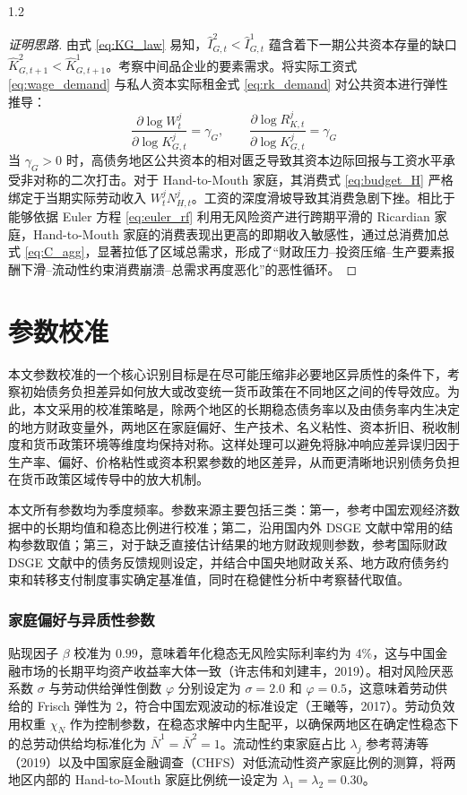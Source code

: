 \documentclass[12pt,UTF8]{ctexart}
\begin{document}
\begin{spacing}{1.2}
		\begin{proof}[证明思路]
			由式 \eqref{eq:KG_law} 易知，$\hat{I}_{G,t}^2 < \hat{I}_{G,t}^1$ 蕴含着下一期公共资本存量的缺口 $\hat{K}_{G,t+1}^2 < \hat{K}_{G,t+1}^1$。考察中间品企业的要素需求。将实际工资式 \eqref{eq:wage_demand} 与私人资本实际租金式 \eqref{eq:rk_demand} 对公共资本进行弹性推导：
			\begin{equation}
				\frac{\partial \log W_t^j}{\partial \log K_{G,t}^j} = \gamma_G, \qquad \frac{\partial \log R_{K,t}^j}{\partial \log K_{G,t}^j} = \gamma_G
			\end{equation}
			当 $\gamma_G > 0$ 时，高债务地区公共资本的相对匮乏导致其资本边际回报与工资水平承受非对称的二次打击。对于 Hand-to-Mouth 家庭，其消费式 \eqref{eq:budget_H} 严格绑定于当期实际劳动收入 $W_t^j N_{H,t}^j$。工资的深度滑坡导致其消费急剧下挫。相比于能够依据 Euler 方程 \eqref{eq:euler_rf} 利用无风险资产进行跨期平滑的 Ricardian 家庭，Hand-to-Mouth 家庭的消费表现出更高的即期收入敏感性，通过总消费加总式 \eqref{eq:C_agg}，显著拉低了区域总需求，形成了“财政压力--投资压缩--生产要素报酬下滑--流动性约束消费崩溃--总需求再度恶化”的恶性循环。
		\end{proof}
		
		\section{参数校准}
		
		本文参数校准的一个核心识别目标是在尽可能压缩非必要地区异质性的条件下，考察初始债务负担差异如何放大或改变统一货币政策在不同地区之间的传导效应。为此，本文采用的校准策略是，除两个地区的长期稳态债务率以及由债务率内生决定的地方财政变量外，两地区在家庭偏好、生产技术、名义粘性、资本折旧、税收制度和货币政策环境等维度均保持对称。这样处理可以避免将脉冲响应差异误归因于生产率、偏好、价格粘性或资本积累参数的地区差异，从而更清晰地识别债务负担在货币政策区域传导中的放大机制。
		
		本文所有参数均为季度频率。参数来源主要包括三类：第一，参考中国宏观经济数据中的长期均值和稳态比例进行校准；第二，沿用国内外 DSGE 文献中常用的结构参数取值；第三，对于缺乏直接估计结果的地方财政规则参数，参考国际财政 DSGE 文献中的债务反馈规则设定，并结合中国央地财政关系、地方政府债务约束和转移支付制度事实确定基准值，同时在稳健性分析中考察替代取值。
		
		\subsubsection{家庭偏好与异质性参数}
		贴现因子 $\beta$ 校准为 $0.99$，意味着年化稳态无风险实际利率约为 4\%，这与中国金融市场的长期平均资产收益率大体一致（许志伟和刘建丰，2019）。相对风险厌恶系数 $\sigma$ 与劳动供给弹性倒数 $\varphi$ 分别设定为 $\sigma = 2.0$ 和 $\varphi = 0.5$，这意味着劳动供给的 Frisch 弹性为 2，符合中国宏观波动的标准设定（王曦等，2017）。劳动负效用权重 $\chi_N$ 作为控制参数，在稳态求解中内生配平，以确保两地区在确定性稳态下的总劳动供给均标准化为 $\bar{N}^1 = \bar{N}^2 = 1$。流动性约束家庭占比 $\lambda_j$ 参考蒋涛等（2019）以及中国家庭金融调查（CHFS）对低流动性资产家庭比例的测算，将两地区内部的 Hand-to-Mouth 家庭比例统一设定为 $\lambda_1 = \lambda_2 = 0.30$。
		

\end{spacing}
\end{document}
